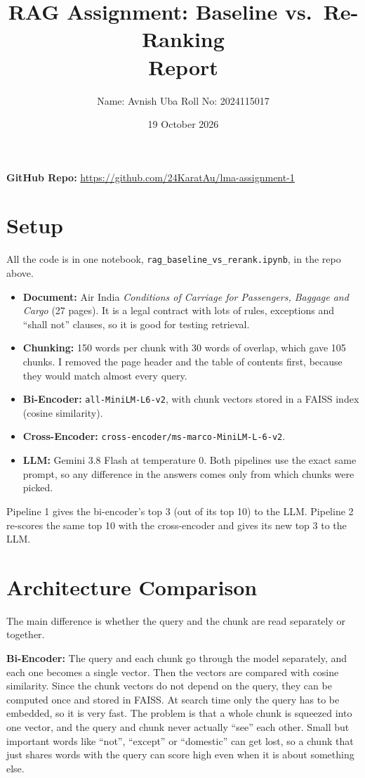 \documentclass[11pt,a4paper]{article}
\title{\textbf{RAG Assignment: Baseline vs.\ Re-Ranking}\\[2pt]\large Report}
\author{Name: Avnish Uba \qquad Roll No: 2024115017}
\date{19 October 2026}
\begin{document}
\maketitle

\textbf{GitHub Repo:} \url{https://github.com/24KaratAu/lma-assignment-1}

\section*{Setup}

All the code is in one notebook, \texttt{rag\_baseline\_vs\_rerank.ipynb}, in the repo above.

\begin{itemize}
  \item \textbf{Document:} Air India \emph{Conditions of Carriage for Passengers, Baggage and Cargo} (27 pages).
        It is a legal contract with lots of rules, exceptions and ``shall not'' clauses, so it is good for testing retrieval.
  \item \textbf{Chunking:} 150 words per chunk with 30 words of overlap, which gave 105 chunks.
        I removed the page header and the table of contents first, because they would match almost every query.
  \item \textbf{Bi-Encoder:} \texttt{all-MiniLM-L6-v2}, with chunk vectors stored in a FAISS index (cosine similarity).
  \item \textbf{Cross-Encoder:} \texttt{cross-encoder/ms-marco-MiniLM-L-6-v2}.
  \item \textbf{LLM:} Gemini 3.8 Flash at temperature 0. Both pipelines use the exact same prompt, so any
        difference in the answers comes only from which chunks were picked.
\end{itemize}

Pipeline 1 gives the bi-encoder's top 3 (out of its top 10) to the LLM. Pipeline 2 re-scores the same top 10
with the cross-encoder and gives its new top 3 to the LLM.

\section{Architecture Comparison}

The main difference is whether the query and the chunk are read separately or together.

\textbf{Bi-Encoder:} The query and each chunk go through the model separately, and each one becomes a single
vector. Then the vectors are compared with cosine similarity. Since the chunk vectors do not depend on the query,
they can be computed once and stored in FAISS. At search time only the query has to be embedded, so it is very fast.
The problem is that a whole chunk is squeezed into one vector, and the query and chunk never actually ``see'' each
other. Small but important words like ``not'', ``except'' or ``domestic'' can get lost, so a chunk that just shares
words with the query can score high even when it is about something else.
\end{document}
